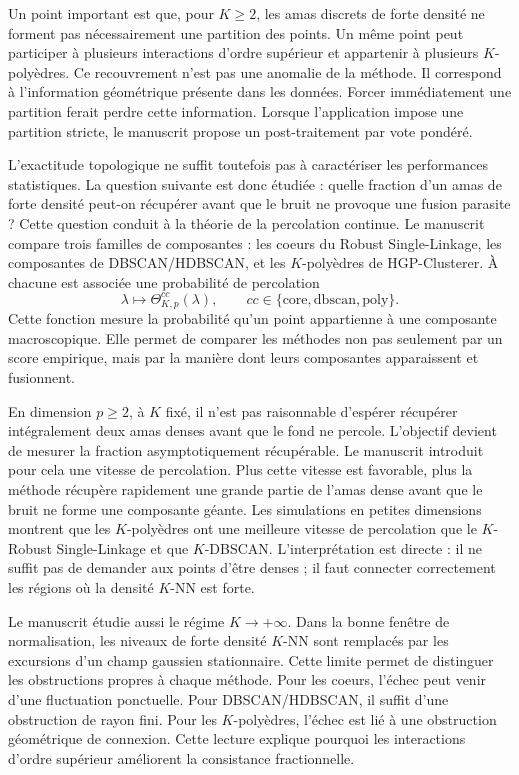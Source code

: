 Un point important est que, pour $K\geq 2$, les amas discrets de forte densité ne forment pas nécessairement une partition des points. Un même point peut participer à plusieurs interactions d'ordre supérieur et appartenir à plusieurs $K$-polyèdres. Ce recouvrement n'est pas une anomalie de la méthode. Il correspond à l'information géométrique présente dans les données. Forcer immédiatement une partition ferait perdre cette information. Lorsque l'application impose une partition stricte, le manuscrit propose un post-traitement par vote pondéré.

L'exactitude topologique ne suffit toutefois pas à caractériser les performances statistiques. La question suivante est donc étudiée : quelle fraction d'un amas de forte densité peut-on récupérer avant que le bruit ne provoque une fusion parasite ? Cette question conduit à la théorie de la percolation continue. Le manuscrit compare trois familles de composantes : les coeurs du Robust Single-Linkage, les composantes de DBSCAN/HDBSCAN, et les $K$-polyèdres de HGP-Clusterer. À chacune est associée une probabilité de percolation
\[
\lambda\longmapsto \Theta^{cc}_{K,p}(\lambda),
\qquad cc\in\{\mathrm{core},\mathrm{dbscan},\mathrm{poly}\}.
\]
Cette fonction mesure la probabilité qu'un point appartienne à une composante macroscopique. Elle permet de comparer les méthodes non pas seulement par un score empirique, mais par la manière dont leurs composantes apparaissent et fusionnent.

En dimension $p\geq 2$, à $K$ fixé, il n'est pas raisonnable d'espérer récupérer intégralement deux amas denses avant que le fond ne percole. L'objectif devient de mesurer la fraction asymptotiquement récupérable. Le manuscrit introduit pour cela une vitesse de percolation. Plus cette vitesse est favorable, plus la méthode récupère rapidement une grande partie de l'amas dense avant que le bruit ne forme une composante géante. Les simulations en petites dimensions montrent que les $K$-polyèdres ont une meilleure vitesse de percolation que le $K$-Robust Single-Linkage et que $K$-DBSCAN. L'interprétation est directe : il ne suffit pas de demander aux points d'être denses ; il faut connecter correctement les régions où la densité $K$-NN est forte.

Le manuscrit étudie aussi le régime $K\to +\infty$. Dans la bonne fenêtre de normalisation, les niveaux de forte densité $K$-NN sont remplacés par les excursions d'un champ gaussien stationnaire. Cette limite permet de distinguer les obstructions propres à chaque méthode. Pour les coeurs, l'échec peut venir d'une fluctuation ponctuelle. Pour DBSCAN/HDBSCAN, il suffit d'une obstruction de rayon fini. Pour les $K$-polyèdres, l'échec est lié à une obstruction géométrique de connexion. Cette lecture explique pourquoi les interactions d'ordre supérieur améliorent la consistance fractionnelle.

